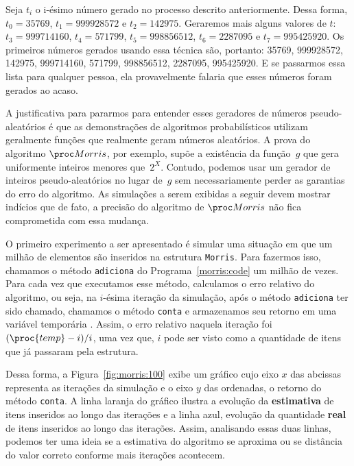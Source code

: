 Seja $t_i$ o i-ésimo número gerado no processo descrito anteriormente. Dessa forma, $t_0 = 35769$, $t_1 = 999928572$ e 
$t_2 = 142975$. Geraremos mais alguns valores de $t$: $t_3 = 999714160$, $t_4 = 571799$, $t_5 = 998856512$, 
$t_6 = 2287095$ e $t_7 = 995425920$. Os primeiros números gerados usando essa técnica são, portanto: 35769, 999928572, 
142975, 999714160, 571799, 998856512, 2287095, 995425920. E se passarmos essa lista para qualquer pessoa, ela 
provavelmente falaria que esses números foram gerados ao acaso.

A justificativa para pararmos para entender esses geradores de números pseudo-aleatórios é que as demonstrações de 
algoritmos probabilísticos utilizam geralmente funções que realmente geram números aleatórios. A prova do algoritmo 
$\Morris$, por exemplo, supõe a existência da função~$g$ que gera uniformente inteiros menores que~$2^X$. Contudo, 
podemos usar um gerador de inteiros pseudo-aleatórios no lugar de~$g$ sem necessariamente perder as garantias do erro
do algoritmo. As simulações a serem exibidas a seguir devem mostrar indícios que de fato, a precisão do algoritmo de 
$\Morris$ não fica comprometida com essa mudança.

O primeiro experimento a ser apresentado é simular uma situação em que um milhão de elementos são inseridos na estrutura 
\texttt{Morris}. Para fazermos isso, chamamos o método \texttt{adiciona} do Programa~\ref{morris:code} um milhão de 
vezes. Para cada vez que executamos esse método, calculamos o erro relativo do algoritmo, ou seja, na $i$-ésima 
iteração da simulação, após o método \texttt{adiciona} ter sido chamado, chamamos o método \texttt{conta} e armazenamos 
seu retorno em uma variável temporária . Assim, o erro relativo naquela iteração foi $(\proc{temp} - i) / i$, 
uma vez que, $i$ pode ser visto como a quantidade de itens que já passaram pela estrutura.

Dessa forma, a Figura~\ref{fig:morris:100} exibe um gráfico cujo eixo $x$ das abcissas representa as iterações da 
simulação e o eixo $y$ das ordenadas, o retorno do método \texttt{conta}. A linha laranja do gráfico ilustra a evolução 
da \textbf{estimativa} de itens inseridos ao longo das iterações e a linha azul, evolução da quantidade \textbf{real} de 
itens inseridos ao longo das iterações. Assim, analisando essas duas linhas, podemos ter uma ideia se a estimativa do 
algoritmo se aproxima ou se distância do valor correto conforme mais iterações acontecem.

